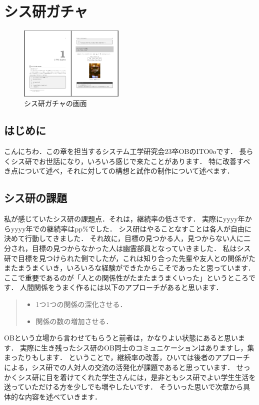 \chapter{シス研ガチャ}
\begin{figure}
  \begin{center}
    \includegraphics[width=5cm]{image/04-Intarasting/chap1/sample.png}
    \caption{シス研ガチャの画面}
    \label{syskengacha_top}
  \end{center}
\end{figure}
\section{はじめに}
こんにちわ．この章を担当するシステム工学研究会23卒OBのITO0oです．
長らくシス研でお世話になり，いろいろ感じで来たことがあります．
特に改善すべき点について述べ，それに対しての構想と試作の制作について述べます．
\section{シス研の課題}
私が感じていたシス研の課題点．それは，継続率の低さです．
実際にyyyy年からyyyy年での継続率はpp\%でした．
シス研はやることなすことは各人が自由に決めて行動してきました．
それ故に，目標の見つかる人，見つからない人に二分され，目標の見つからなかった人は幽霊部員となっていきました．
私はシス研で目標を見つけられた側でしたが，これは知り合った先輩や友人との関係がたまたまうまくいき，いろいろな経験ができたからこそであったと思っています．
ここで重要であるのが「人との関係性がたまたまうまくいった」というところです．
人間関係をうまく作るには以下のアプローチがあると思います．
\begin{quote}
  \begin{itemize}
    \item 1つ1つの関係の深化させる．
    \item 関係の数の増加させる．
  \end{itemize}
\end{quote}
OBという立場から言わせてもらうと前者は，かなりよい状態にあると思います．
実際に生き残ったシス研のOB同士のコミュニケーションはありますし，集まったりもします．
ということで，継続率の改善，ひいては後者のアプローチによる，シス研での人対人の交流の活発化が課題であると思っています．
せっかくシス研に目を着けてくれた学生さんには，是非ともシス研でよい学生生活を送っていただける方を少しでも増やしたいです．
そういった思いで次章から具体的な内容を述べていきます．
